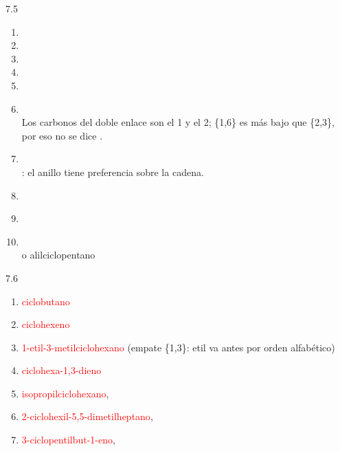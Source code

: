 \begin{Solution}{7.5}
        \begin{enumerate}[label=\alph*)]
            \item {}
            \item {}
            \item {}
            \item {}
            \item {}
            \item {}\\
                  Los carbonos del doble enlace son el 1 y el 2; \{1,6\} es más bajo que \{2,3\}, por eso no se dice .
            \item {}\\
                  : el anillo tiene preferencia sobre la cadena.
            \item {}\\
            \item {}
            \item {}\\
                   o alilciclopentano
        \end{enumerate}
    
\end{Solution}
\begin{Solution}{7.6}
        \begin{enumerate}[label=\alph*)]
            \item \textcolor{red}{ciclobutano}
            \item \textcolor{red}{ciclohexeno}
            \item \textcolor{red}{1-etil-3-metilciclohexano} (empate \{1,3\}: etil va antes por orden alfabético)
            \item \textcolor{red}{ciclohexa-1,3-dieno}
            \item \textcolor{red}{isopropilciclohexano}, 
            \item \textcolor{red}{2-ciclohexil-5,5-dimetilheptano}, 
            \item \textcolor{red}{3-ciclopentilbut-1-eno}, 
        \end{enumerate}
    
\end{Solution}

